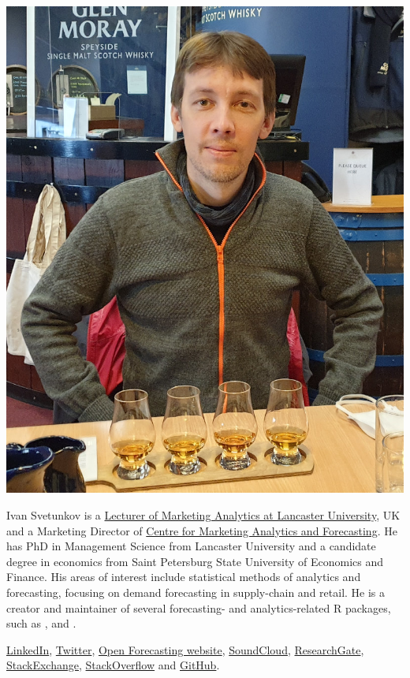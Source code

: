 \documentclass[
]{book}
\theoremstyle{definition}
\theoremstyle{definition}
\theoremstyle{definition}
\theoremstyle{definition}
\theoremstyle{remark}
\begin{document}
\begin{center}\includegraphics[width=0.6\linewidth]{images/IvanSvetunkov-web} \end{center}

Ivan Svetunkov is a \href{https://www.lancaster.ac.uk/lums/people/ivan-svetunkov}{Lecturer of Marketing Analytics at Lancaster University}, UK and a Marketing Director of \href{https://www.lancaster.ac.uk/lums/cmaf/}{Centre for Marketing Analytics and Forecasting}. He has PhD in Management Science from Lancaster University and a candidate degree in economics from Saint Petersburg State University of Economics and Finance. His areas of interest include statistical methods of analytics and forecasting, focusing on demand forecasting in supply-chain and retail. He is a creator and maintainer of several forecasting- and analytics-related R packages, such as \citet{R-greybox}, \citet{R-smooth} and \citet{R-legion}.

\href{https://www.linkedin.com/in/isvetunkov/}{LinkedIn}, \href{https://twitter.com/iSvetunkov}{Twitter}, \href{https://forecasting.svetunkov.ru/}{Open Forecasting website}, \href{https://soundcloud.com/ivan-svetunkov}{SoundCloud}, \href{https://www.researchgate.net/profile/Ivan_Svetunkov}{ResearchGate}, \href{http://stats.stackexchange.com/users/87585/ivan-svetunkov}{StackExchange}, \href{http://stackoverflow.com/users/5296618/ivan-svetunkov}{StackOverflow} and \href{https://github.com/config-i1}{GitHub}.

  
\end{document}
